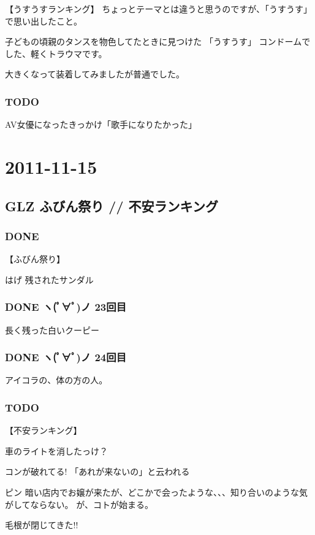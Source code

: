 \documentclass[11pt]{article}
\begin{document}
【うすうすランキング】
ちょっとテーマとは違うと思うのですが、「うすうす」で思い出したこと。

子どもの頃親のタンスを物色してたときに見つけた
「うすうす」
コンドームでした、軽くトラウマです。

大きくなって装着してみましたが普通でした。
\subsubsection{\textbf{TODO}}
\label{sec-37_1_4}

AV女優になったきっかけ「歌手になりたかった」
\section{2011-11-15}
\label{sec-38}
\subsection{GLZ ふびん祭り // 不安ランキング}
\label{sec-38_1}
\subsubsection{\textbf{DONE}}
\label{sec-38_1_1}

【ふびん祭り】

はげ
残されたサンダル
\subsubsection{\textbf{DONE} ヽ(ﾟ∀ﾟ)ノ 23回目}
\label{sec-38_1_2}

長く残った白いクーピー
\subsubsection{\textbf{DONE} ヽ(ﾟ∀ﾟ)ノ 24回目}
\label{sec-38_1_3}

アイコラの、体の方の人。
\subsubsection{\textbf{TODO}}
\label{sec-38_1_4}

【不安ランキング】

車のライトを消したっけ？

コンが破れてる!
「あれが来ないの」と云われる

ピン 暗い店内でお嬢が来たが、どこかで会ったような、、、知り合いのような気がしてならない。
が、コトが始まる。

毛根が閉じてきた!!
\end{document}
